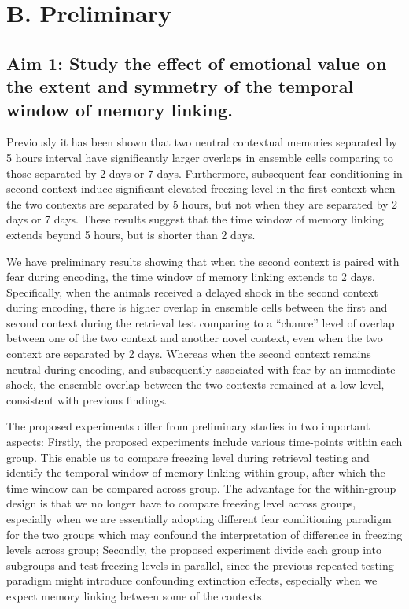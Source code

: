 \documentclass[master.tex]{subfiles}
\begin{document}
\section*{B. Preliminary}

\subsection{Aim 1: Study the effect of emotional value on the extent and symmetry
  of the temporal window of memory linking.}

Previously it has been shown that two neutral contextual memories separated by 5
hours interval have significantly larger overlaps in ensemble cells comparing to
those separated by 2 days or 7 days. Furthermore, subsequent fear conditioning
in second context induce significant elevated freezing level in the first
context when the two contexts are separated by 5 hours, but not when they are
separated by 2 days or 7 days. These results suggest that the time window of
memory linking extends beyond 5 hours, but is shorter than 2 days.

We have preliminary results showing that when the second context is paired with
fear during encoding, the time window of memory linking extends to 2 days.
Specifically, when the animals received a delayed shock in the second context
during encoding, there is higher overlap in ensemble cells between the first and
second context during the retrieval test comparing to a ``chance'' level of
overlap between one of the two context and another novel context, even when the
two context are separated by 2 days. Whereas when the second context remains
neutral during encoding, and subsequently associated with fear by an immediate
shock, the ensemble overlap between the two contexts remained at a low level,
consistent with previous findings.

The proposed experiments differ from preliminary studies in two important
aspects: Firstly, the proposed experiments include various time-points within
each group. This enable us to compare freezing level during retrieval testing
and identify the temporal window of memory linking within group, after which the
time window can be compared across group. The advantage for the within-group
design is that we no longer have to compare freezing level across groups,
especially when we are essentially adopting different fear conditioning paradigm
for the two groups which may confound the interpretation of difference in
freezing levels across group; Secondly, the proposed experiment divide each
group into subgroups and test freezing levels in parallel, since the previous
repeated testing paradigm might introduce confounding extinction effects,
especially when we expect memory linking between some of the contexts.
\end{document}
